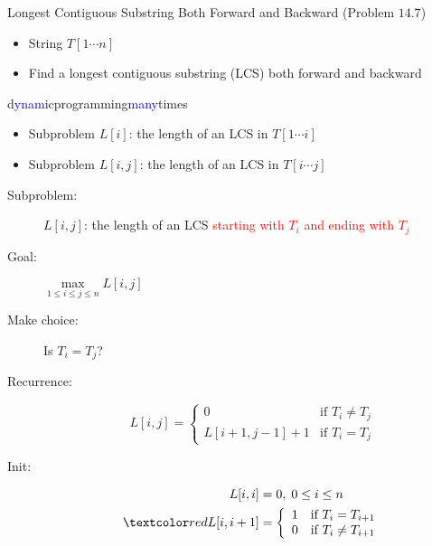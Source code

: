 \begin{frame}{}
  \begin{exampleblock}{Longest Contiguous Substring Both Forward and Backward (Problem $14.7$)}
    \begin{itemize}
      \item String $T[1 \cdots n]$
      \item Find a longest contiguous substring (LCS) both forward and backward
    \end{itemize}
  \end{exampleblock}

  \begin{center}
    d\textcolor{blue}{ynam}icprogramming\textcolor{blue}{many}times
  \end{center}

  \begin{itemize}
    \item Subproblem $L[i]$: the length of an LCS in $T[1 \cdots i]$
    \item Subproblem $L[i,j]$: the length of an LCS in $T[i \cdots j]$
  \end{itemize}
\end{frame}
\begin{frame}{}
  \begin{description}
	\item[Subproblem:] $L[i,j]$: the length of an LCS \textcolor{red}{starting with $T_{i}$ and ending with $T_{j}$}
	\item[Goal:] $\max\limits_{1 \le i \le j \le n} L[i,j]$
	  \pause
	\item[Make choice:] Is $T_{i} = T_{j}$?
	\item[Recurrence:] 
	  \begin{displaymath}
		L[i,j] = \left\{ \begin{array}{ll}
		  0 & \textrm{if $T_{i} \neq T_{j}$}  \\
		  L[i+1,j-1] + 1 & \textrm{if $T_{i} = T_{j}$}
		\end{array} \right.
	  \end{displaymath}
	  \pause
	\item[Init:]
	  \begin{align*}
	    L[i,i] &= 0, \; 0 \le i \le n  \\
	    \red{L[i,i+1]} &= \left\{ \begin{array}{ll}
	      1 & \text{if } T_{i} = T_{i+1}  \\
	      0 & \text{if } T_{i} \neq T_{i+1}
	      \end{array} \right.
	  \end{align*}
  \end{description}
\end{frame}
